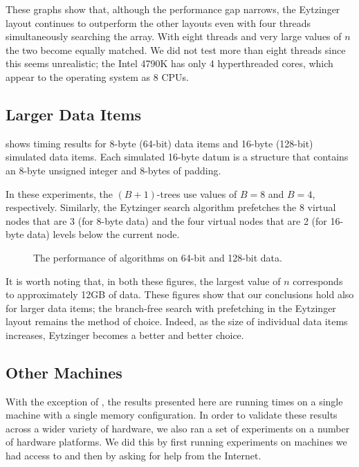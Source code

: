 \documentclass{patmorin}
\begin{document}
These graphs show that, although the performance gap narrows, the
Eytzinger layout continues to outperform the other layouts even with four
threads simultaneously searching the array.  With eight threads and very
large values of $n$ the two become equally matched.  We did not test more
than eight threads since this seems unrealistic; the Intel 4790K has only
4 hyperthreaded cores, which appear to the operating system as 8 CPUs.


\subsection{Larger Data Items}

 shows timing results for 8-byte (64-bit) data items and
16-byte (128-bit) simulated data items.  Each simulated 16-byte datum is a
structure that contains an 8-byte unsigned integer and 8-bytes of padding.

In these experiments, the $(B+1)$-trees use values of $B=8$ and $B=4$,
respectively. Similarly, the Eytzinger search algorithm prefetches the
8 virtual nodes that are 3 (for 8-byte data) and the four virtual nodes
that are 2 (for 16-byte data) levels below the current node.

\begin{figure}
   \caption{The performance of algorithms on 64-bit and 128-bit data.}
\end{figure}

It is worth noting that, in both these figures, the largest value of
$n$ corresponds to approximately 12GB of data. These figures show that
our conclusions hold also for larger data items; the branch-free search
with prefetching in the Eytzinger layout remains the method of choice.
Indeed, as the size of individual data items increases, Eytzinger becomes
a better and better choice.

\subsection{Other Machines}

With the exception of , the results presented here are
running times on a single machine with a single memory configuration.
In order to validate these results across a wider variety of hardware,
we also ran a set of experiments on a number of hardware platforms. We
did this by first running experiments on machines we had access to and
then by asking for help from the Internet.
\end{document}
